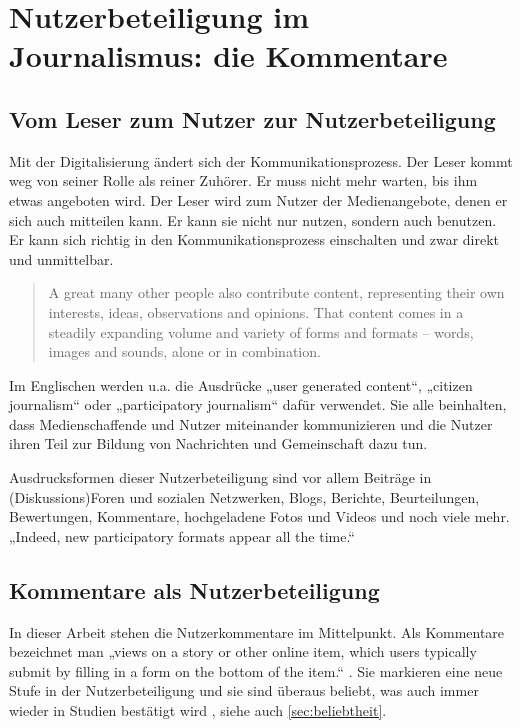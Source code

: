 \chapter{Nutzerbeteiligung im Journalismus: die Kommentare}
\label{kap:nutzerbeteiligung}

\section{Vom Leser zum Nutzer zur Nutzerbeteiligung}

Mit der Digitalisierung ändert sich der Kommunikationsprozess. Der Leser kommt
weg von seiner Rolle als reiner Zuhörer. Er muss nicht mehr warten, bis ihm
etwas angeboten wird. Der Leser wird zum Nutzer der Medienangebote, denen er
sich auch mitteilen kann. Er kann sie nicht nur nutzen, sondern auch benutzen.
Er kann sich richtig in den Kommunikationsprozess einschalten und zwar direkt
und unmittelbar.

\begin{quote}
\glqq A great many other people also contribute content, representing their own
interests, ideas, observations and opinions. That content comes in a steadily
expanding volume and variety of forms and formats – words, images and sounds,
alone or in combination.\grqq{} \autocite[S.~1]{participatory}
\end{quote}

Im Englischen werden u.a. die Ausdrücke „user generated content“, „citizen
journalism“ oder „participatory journalism“ \autocite[S.~2]{participatory} dafür
verwendet. Sie alle beinhalten, dass Medienschaffende und Nutzer miteinander
kommunizieren und die Nutzer ihren Teil zur Bildung von Nachrichten und
Gemeinschaft dazu tun.

Ausdrucksformen dieser Nutzerbeteiligung sind vor allem Beiträge in
(Dis\-kus\-si\-ons)\-Foren und sozialen Netzwerken, Blogs, Berichte, Beurteilungen,
Bewertungen, Kommentare, hochgeladene Fotos und Videos und noch viele mehr.
„Indeed, new participatory formats appear all the time.“ \autocite[S.~2 und
S.~17]{participatory}


\section{Kommentare als Nutzerbeteiligung}

In dieser Arbeit stehen die Nutzerkommentare im Mittelpunkt. Als Kommentare
bezeichnet man „views on a story or other online item, which users typically
submit by filling in a form on the bottom of the item.“
\autocite[S.~17]{participatory}.  Sie markieren eine neue Stufe in der
Nutzerbeteiligung und sie sind überaus beliebt, was auch immer wieder in Studien
bestätigt wird \autocite[S.~97]{reich}, siehe auch \ref{sec:beliebtheit}.


